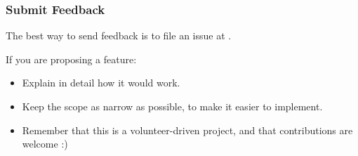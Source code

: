 \documentclass[letterpaper,10pt,english]{sphinxmanual}
\begin{document}
\subsubsection{Submit Feedback}
\label{\detokenize{contributing:submit-feedback}}
The best way to send feedback is to file an issue at .

If you are proposing a feature:
\begin{itemize}
\item {} 
Explain in detail how it would work.

\item {} 
Keep the scope as narrow as possible, to make it easier to implement.

\item {} 
Remember that this is a volunteer-driven project, and that contributions
are welcome :)

\end{itemize}
\end{document}
